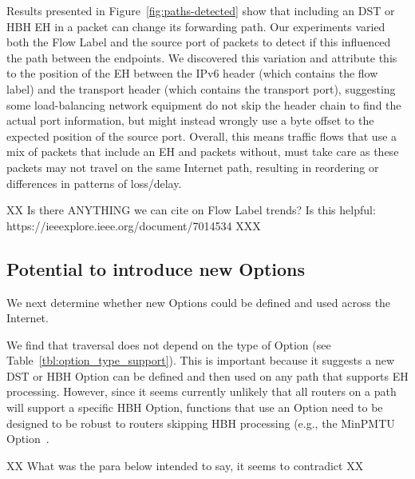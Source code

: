 \documentclass[conference]{IEEEtran}
\begin{document}

Results presented in Figure~\ref{fig:paths-detected} show that including an DST or HBH EH in a packet can change its forwarding path. Our experiments varied both the Flow Label and the source port of packets to detect if this influenced the path between the endpoints. We discovered this variation and attribute this to the position of the EH between the IPv6 header (which contains the flow label) and the transport header (which contains the transport port), suggesting some load-balancing network equipment do not skip the header chain to find the actual port information, but might instead wrongly use a byte offset to the expected position of the source port. Overall, this means traffic flows that use a mix of packets that include an EH and packets without, must take care as these packets may not travel on the same Internet path, resulting in reordering or differences in patterns of loss/delay. 

XX Is there ANYTHING we can cite on Flow Label trends? Is this helpful: https://ieeexplore.ieee.org/document/7014534  XXX

\subsection{Potential to introduce new Options}

We next determine whether new Options could be defined and used across the Internet.

We find that traversal does not depend on the type of Option  (see Table~\ref{tbl:option_type_support}). This is important because it suggests a new DST or HBH Option can be defined and then used on any path that supports EH processing. 
However, since it seems currently unlikely that all routers on a path will support a specific HBH Option, functions that use an Option need to be designed to be robust to routers skipping HBH processing (e.g., the MinPMTU  Option~\cite{rfc9268,rfc9343}. 

XX What was the para below intended to say, it seems to contradict XX
\end{document}
